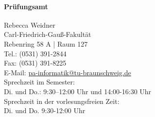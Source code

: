 \begin{multicols}{2}
	\paragraph{Prüfungsamt}
		Rebecca Weidner\\
		Carl-Friedrich-Gauß-Fakultät\\
		Rebenring 58 A | Raum 127\\
		Tel.: (0531) 391-2844\\
		Fax: (0531) 391-8225\\
		E-Mail: \url{pa-informatik@tu-braunschweig.de}\\
		Sprechzeit im Semester:\\
		Di. und Do.: 9:30–12:00 Uhr und 14:00-16:30 Uhr\\
		Sprechzeit in der vorlesungsfreien Zeit:\\
		Di. und Do. 9:30-12:00 Uhr
\end{multicols}
